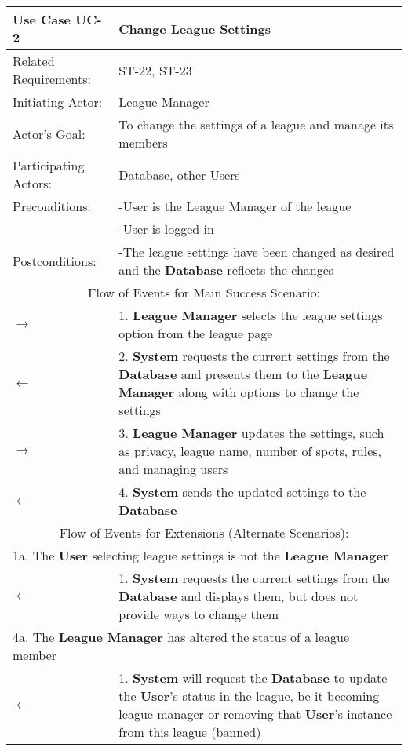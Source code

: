 \begin{centering}
\renewcommand\arraystretch{1.3} %
\begin{longtable}{|p{1.2in} p{5in}|}
\hline
\bfseries{\color{color1}Use Case UC-2} & \bfseries{\color{color1}Change League Settings} \\
\hline
Related Requirements: & ST-22, ST-23\\ 
Initiating Actor:     & League Manager \\
Actor's Goal:         & To change the settings of a league and manage its members \\
Participating Actors:  & Database, other Users \\
Preconditions:        & -User is the League Manager of the league \\
 & -User is logged in \\
Postconditions:       & -The league settings have been changed as desired and the \textbf{Database} reflects the changes \\
\hline
\multicolumn{2}{|c|}{\color{color1}Flow of Events for Main Success Scenario:}\\
\hline
$\rightarrow$ & 1. \textbf{League Manager} selects the league settings option from the league page \\
$\leftarrow$ & 2. \textbf{System} requests the current settings from the \textbf{Database} and presents them to the \textbf{League Manager} along with options to change the settings \\
$\rightarrow$ & 3. \textbf{League Manager} updates the settings, such as privacy, league name, number of spots, rules, and managing users \\
$\leftarrow$ & 4. \textbf{System} sends the updated settings to the \textbf{Database} \\
\hline
\multicolumn{2}{|c|}{\color{color1}Flow of Events for Extensions (Alternate Scenarios):} \\
\hline
\multicolumn{2}{|l|}{1a. The \textbf{User} selecting league settings is not the \textbf{League Manager}} \\
\hline
$\leftarrow$ & 1. \textbf{System} requests the current settings from the \textbf{Database} and displays them, but does not provide ways to change them \\
\hline
\multicolumn{2}{|l|}{4a. The \textbf{League Manager} has altered the status of a league member} \\
\hline
$\leftarrow$ & 1. \textbf{System} will request the \textbf{Database} to update the \textbf{User}'s status in the league, be it becoming league manager or removing that \textbf{User}'s instance from this league (banned)\\
\hline
\end{longtable}
\end{centering}

